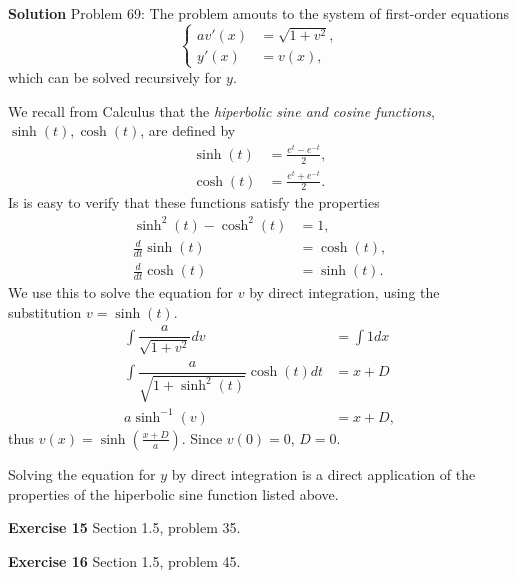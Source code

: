 \documentclass[12pt,oneside]{exam}
\newenvironment{exercise}[1]{\vspace{.1in}\noindent\textbf{Exercise #1 \hspace{.05em}}}{}
\newenvironment{newsolution}{\vspace{.1in}\noindent\textbf{Solution \hspace{.05em}}}{}
\begin{document}
\begin{newsolution}
Problem 69: 
The problem amouts to the system of first-order equations
\begin{equation*}
\left\{  
\begin{array}{rl}
av'(x) & = \sqrt{1+v^2}, \\
y'(x) & = v(x),
\end{array}
\right.
\end{equation*}
which can be solved recursively for $y$. 

We recall from Calculus that the \textit{hiperbolic sine and cosine functions}, $\sinh(t),\cosh(t)$, are defined by 
\begin{align*}
\sinh(t) & = \frac{e^t -e^{-t}}{2}, \\
\cosh(t) & = \frac{e^t + e^{-t}}{2}.
\end{align*}
Is is easy to verify that these functions satisfy the properties
\begin{align*}
\sinh^2(t) - \cosh^2(t) & = 1, \\
\frac{d}{dt}\sinh(t) & = \cosh(t), \\
\frac{d}{dt} \cosh(t) & = \sinh(t).
\end{align*}
We use this to solve the equation for $v$ by direct integration, using the substitution $v=\sinh(t)$.
\begin{align*}
\int \dfrac{a}{\sqrt{1+v^2}} dv & = \int 1 dx \\
\int \dfrac{a}{\sqrt{1+\sinh^2(t)}}\cosh(t) dt & = x + D\\
a \sinh^{-1}(v) & = x + D,
\end{align*}
thus $v(x)=\sinh(\frac{x+D}{a})$. Since $v(0)=0$, $D=0$. 

Solving the equation for $y$ by direct integration is a direct application of the properties of the hiperbolic sine function listed above. 
\end{newsolution}

\begin{exercise}{15}
Section 1.5, problem 35. 
\end{exercise}

\begin{exercise}{16}
Section 1.5, problem 45. 
\end{exercise}
\end{document}
